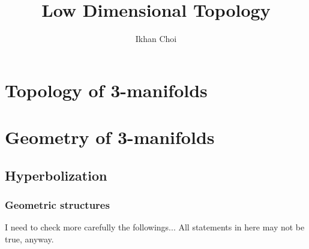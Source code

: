 \documentclass{../../large}
\begin{document}
\title{Low Dimensional Topology}
\author{Ikhan Choi}
\maketitle
\tableofcontents

\part{Topology of 3-manifolds}
\chapter{}
\chapter{}
\chapter{}


\part{Geometry of 3-manifolds}
\chapter{Hyperbolization}
\section{Geometric structures}

I need to check more carefully the followings...
All statements in here may not be true, anyway.
\end{document}
